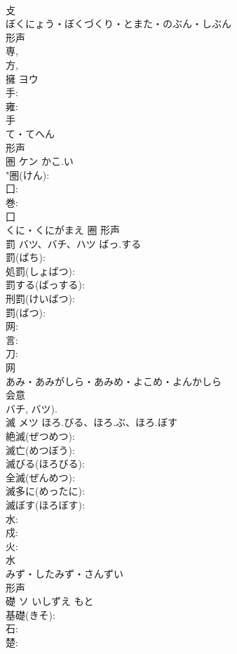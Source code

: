 \documentclass[8pt]{extreport}
\begin{document}
\begin{CJK}{UTF8}{min}
\\	攴	
\\	ぼくにょう・ぼくづくり・とまた・のぶん・しぶん	
\\	形声 
\\	専, 
\\	方, 
\\	擁	ヨウ			
\\	手: 
\\	雍: 
\\	手	
\\	て・てへん	
\\	形声 
\\	圏	ケン	かこ.い		
\\	"圏(けん): 
\\	囗: 
\\	巻: 
\\	囗	
\\	くに・くにがまえ	圈	形声 
\\	罰	バツ、バチ、ハツ	ばっ.する		
\\	罰(ばち): 
\\	処罰(しょばつ): 
\\	罰する(ばっする): 
\\	刑罰(けいばつ): 
\\	罰(ばつ): 
\\	网: 
\\	言: 
\\	刀: 
\\	网	
\\	あみ・あみがしら・あみめ・よこめ・よんかしら	
\\	会意 
\\	バチ, バツ).	
\\	滅	メツ	ほろ.びる、ほろ.ぶ、ほろ.ぼす		
\\	絶滅(ぜつめつ): 
\\	滅亡(めつぼう): 
\\	滅びる(ほろびる): 
\\	全滅(ぜんめつ): 
\\	滅多に(めったに): 
\\	滅ぼす(ほろぼす): 
\\	水: 
\\	戍: 
\\	火: 
\\	水	
\\	みず・したみず・さんずい	
\\	形声 
\\	礎	ソ	いしずえ	もと	
\\	基礎(きそ): 
\\	石: 
\\	楚: 

\end{CJK}
\end{document}
